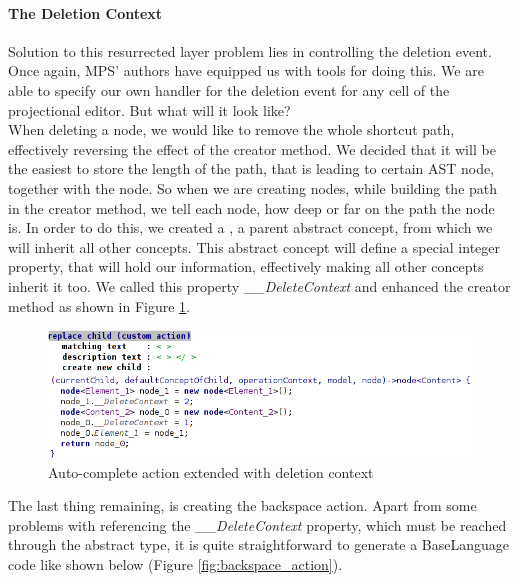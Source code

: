 \paragraph {The Deletion Context}

Solution to this resurrected layer problem lies in controlling the deletion event.
Once again, MPS' authors have equipped us with tools for doing this.
We are able to specify our own handler for the deletion event for any cell of the projectional editor.
But what will it look like?
\\

When deleting a node, we would like to remove the whole shortcut path, effectively reversing the effect of the creator method.
We decided that it will be the easiest to store the length of the path, that is leading to certain AST node, together with the node.
So when we are creating nodes, while building the path in the creator method, we tell each node, how deep or far on the path the node is.
In order to do this, we created a , a parent abstract concept, from which we will inherit all other concepts.
This abstract concept will define a special integer property, that will hold our information, effectively making all other concepts inherit it too.
We called this property \textit{{\_}{\_}DeleteContext} and enhanced the creator method as shown in Figure \ref{fig:autocomplete_action_delete_context}.

\begin{figure}[h]
	\centering
	\includegraphics[width=\textwidth]{./img/autocomplete_action_delete_context.png}
	\caption{Auto-complete action extended with deletion context}
	\label{fig:autocomplete_action_delete_context}
\end{figure}

The last thing remaining, is creating the backspace action.
Apart from some problems with referencing the \textit{{\_}{\_}DeleteContext} property, which must be reached through the abstract  type, it is quite straightforward to generate a BaseLanguage code like shown below (Figure \ref{fig:backspace_action}).

